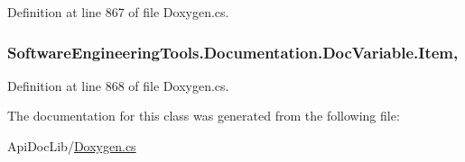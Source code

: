 Definition at line 867 of file Doxygen.\+cs.

\hypertarget{class_software_engineering_tools_1_1_documentation_1_1_doc_variable_a99e3e7284e92b1e6a93515da3c4d106d}{
\subsubsection[{Item}]{ Software\+Engineering\+Tools.\+Documentation.\+Doc\+Variable.\+Item\hspace{0.3cm}{\ttfamily [get]}, {\ttfamily [set]}}}\label{class_software_engineering_tools_1_1_documentation_1_1_doc_variable_a99e3e7284e92b1e6a93515da3c4d106d}


Definition at line 868 of file Doxygen.\+cs.



The documentation for this class was generated from the following file\+:\begin{DoxyCompactItemize}
\item 
Api\+Doc\+Lib/\hyperlink{_doxygen_8cs}{Doxygen.\+cs}\end{DoxyCompactItemize}
